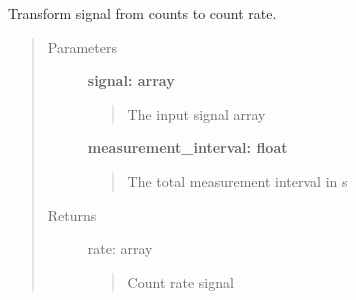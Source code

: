 \documentclass[letterpaper,10pt,english]{sphinxmanual}
\begin{document}
\begin{fulllineitems}
\label{pre_processing:pre_processing.counts_to_rate}
Transform signal from counts to count rate.
\begin{quote}\begin{description}
\item[{Parameters}] \leavevmode
\textbf{signal: array}
\begin{quote}

The input signal array
\end{quote}

\textbf{measurement\_interval: float}
\begin{quote}

The total measurement interval in s
\end{quote}

\item[{Returns}] \leavevmode
rate: array
\begin{quote}

Count rate signal
\end{quote}

\end{description}\end{quote}

\end{fulllineitems}

\end{document}
